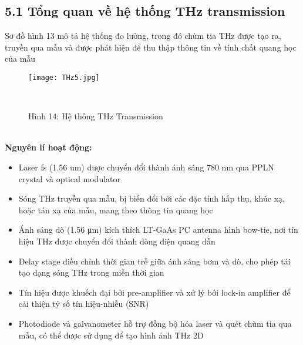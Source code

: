 \documentclass[a4paper,13pt]{article}
\begin{document}
\subsection{5.1 Tổng quan về hệ thống THz transmission}
Sơ đồ hình 13 mô tả hệ thống đo lường, trong đó chùm tia THz được tạo ra, truyền qua mẫu và được phát hiện để thu thập thông tin về tính chất quang học của mẫu
\begin{figure}[htbp]
    \centering
\texttt{[image: THz5.jpg]}
    \caption*{Hình 14: Hệ thống THz Transmission\cite{key6} } \\

    \label{fig:model}
\end{figure} \\
\textbf{Nguyên lí hoạt động:}
\begin{itemize}
\item Laser fs (1.56 um) được chuyển đổi thành ánh sáng 780 nm qua PPLN crystal và optical modulator
\item Sóng THz truyền qua mẫu, bị biến đổi bởi các đặc tính hấp thụ, khúc xạ, hoặc tán xạ của mẫu, mang theo thông tin quang học
\item Ánh sáng dò (1.56 μm) kích thích LT-GaAs PC antenna hình bow-tie, nơi tín hiệu THz được chuyển đổi thành dòng điện quang dẫn
\item Delay stage điều chỉnh thời gian trễ giữa ánh sáng bơm và dò, cho phép tái tạo dạng sóng THz trong miền thời gian
\item Tín hiệu được khuếch đại bởi pre-amplifier và xử lý bởi lock-in amplifier để cải thiện tỷ số tín hiệu-nhiễu (SNR)
\item Photodiode và galvanometer hỗ trợ đồng bộ hóa laser và quét chùm tia qua mẫu, có thể được sử dụng để tạo hình ảnh THz 2D
\end{itemize}
\end{document}

